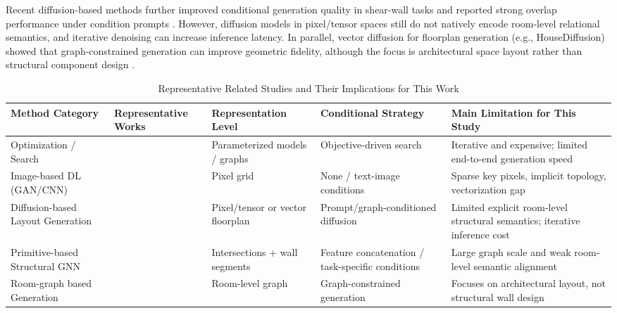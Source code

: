 Recent diffusion-based methods further improved conditional generation quality in shear-wall tasks and reported strong overlap performance under condition prompts \cite{guIntelligentDesignShear2024,zhouStructDiffusionEndendIntelligent2024}. However, diffusion models in pixel/tensor spaces still do not natively encode room-level relational semantics, and iterative denoising can increase inference latency. In parallel, vector diffusion for floorplan generation (e.g., HouseDiffusion) showed that graph-constrained generation can improve geometric fidelity, although the focus is architectural space layout rather than structural component design \cite{shabaniHouseDiffusionVectorFloorplan2022,liFrameDiffusionLatentDiffusion2025}.

\begin{table}[t]
\centering
\caption{Representative Related Studies and Their Implications for This Work}
\label{tab:related_work}
\small
\setlength{\tabcolsep}{4pt}
\begin{tabularx}{\textwidth}{
>{\raggedright\arraybackslash}p{3.0cm}
>{\raggedright\arraybackslash}p{2.35cm}
>{\raggedright\arraybackslash}p{2.25cm}
>{\raggedright\arraybackslash\hsize=0.85\hsize}X
>{\raggedright\arraybackslash\hsize=1.15\hsize}X
}
\toprule
Method Category & Representative Works & Representation Level & Conditional Strategy & Main Limitation for This Study \\
\midrule
Optimization / Search & \cite{zhouAutomatedStructuralDesign2022b,muellerCombiningStructuralPerformance2015,luoAlphaTrussMonteCarlo2022a} & Parameterized models / graphs & Objective-driven search & Iterative and expensive; limited end-to-end generation speed \\
Image-based DL (GAN/CNN) & \cite{liaoAutomatedStructuralDesign2021a,liaoIntelligentGenerativeStructural2022a,luIntelligentStructuralDesign2022a,fuDualGenerativeAdversarial2023} & Pixel grid & None / text-image conditions & Sparse key pixels, implicit topology, vectorization gap \\
Diffusion-based Layout Generation & \cite{guIntelligentDesignShear2024, zhouStructDiffusionEndendIntelligent2024,shabaniHouseDiffusionVectorFloorplan2022} & Pixel/tensor or vector floorplan & Prompt/graph-conditioned diffusion & Limited explicit room-level structural semantics; iterative inference cost \\
Primitive-based Structural GNN & \cite{zhaoIntelligentDesignShear2023b,zhaoDesignconditioninformedShearWall2023d,IntelligentCodesignShear2025,zhangEndtoendGenerationStructural} & Intersections + wall segments & Feature concatenation / task-specific conditions & Large graph scale and weak room-level semantic alignment \\
Room-graph based Generation & \cite{nauataHouseGANRelationalGenerative2020} & Room-level graph & Graph-constrained generation & Focuses on architectural layout, not structural wall design \\
\bottomrule
\end{tabularx}
\end{table}

